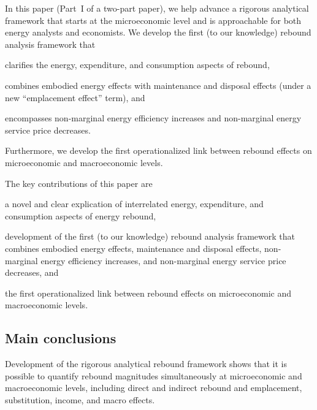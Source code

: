 \documentclass[12pt]{article}    %
\begin{document}
In this paper (Part~I of a two-part paper),
we help advance a rigorous analytical framework
that starts at the microeconomic level
and is approachable for both energy analysts and economists. 
We develop the first (to our knowledge)
rebound analysis framework that 
%
\begin{enumerate*}[label={(\roman*)}]
	
  \item clarifies the energy, expenditure, and consumption aspects of rebound,

  \item combines 
        embodied energy effects with
        maintenance and disposal effects
        (under a new ``emplacement effect'' term), and

  \item encompasses non-marginal energy efficiency increases and
        non-marginal energy service price decreases.
  
\end{enumerate*}
%
Furthermore, we develop the first operationalized link between 
rebound effects on microeconomic and macroeconomic levels.

The key contributions of this paper are 
%
\begin{enumerate*}[label={(\roman*)}]
	
	\item a novel and clear explication of interrelated
	      energy, expenditure, and consumption
	      aspects of energy rebound,
	
  \item development of the first (to our knowledge)
        rebound analysis framework that combines 
        embodied energy effects, 
        maintenance and disposal effects, 
        non-marginal energy efficiency increases, and 
        non-marginal energy service price decreases, and

  \item the first operationalized link between 
        rebound effects on microeconomic and macroeconomic levels.
        
\end{enumerate*}

\subsection*{Main conclusions}
\label{sec:conclusions}

Development of the rigorous analytical rebound framework shows that
it is possible to quantify rebound magnitudes simultaneously
at microeconomic and macroeconomic levels, including 
direct and indirect rebound 
and emplacement, substitution, income, and macro effects.
\end{document}
